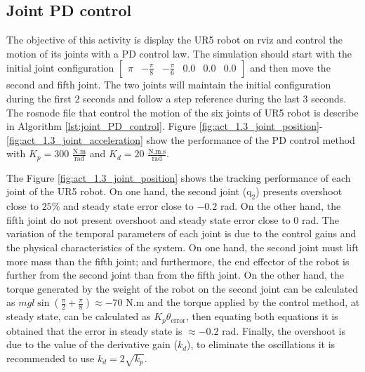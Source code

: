 \subsection{Joint PD control}
The objective of this activity is display the UR5 robot on rviz and control the motion of its joints with a PD control law. The simulation should start with the initial joint configuration $\begin{bmatrix} \pi & -\frac{\pi}{8} & -\frac{\pi}{6} & 0.0 & 0.0 & 0.0 \end{bmatrix}$ and then move the second and fifth joint. The two joints will maintain the initial configuration during the first $2$ seconds and follow a step reference during the last $3$ seconds. The rosnode file that control the motion of the six joints of UR5 robot is describe in Algorithm \ref{lst:joint_PD_control}. Figure \ref{fig:act_1.3_joint_position}-\ref{fig:act_1.3_joint_acceleration} show the performance of the PD control method with $K_p=300$ $\mathrm{\frac{N.m}{rad}}$ and $K_d=20$ $\mathrm{\frac{N.m.s}{rad}}$. 

The Figure \ref{fig:act_1.3_joint_position} shows the tracking performance of each joint of the UR5 robot. On one hand, the second joint ($\mathrm{q}_2$) presents overshoot close to $25\%$ and steady state error close to $-0.2$ rad. On the other hand, the fifth joint do not present overshoot and steady state error close to $0$ rad. The variation of the temporal parameters of each joint is due to the control gains and the physical characteristics of the system. On one hand, the second joint must lift more mass than the fifth joint; and furthermore, the end effector of the robot is further from the second joint than from the fifth joint. On the other hand, the torque generated by the weight of the robot on the second joint can be calculated as $m g l \sin({\frac{\pi}{2} + \frac{\pi}{8}}) \approx -70$ N.m and the torque applied by the control method, at steady state, can be calculated as $K_p \theta_{\mathrm{error}}$, then equating both equations it is obtained that the error in steady state is $\approx -0.2$ rad. Finally, the overshoot is due to the value of the derivative gain ($k_d$), to eliminate the oscillations it is recommended to use $k_d = 2 \sqrt{k_p}$. 



